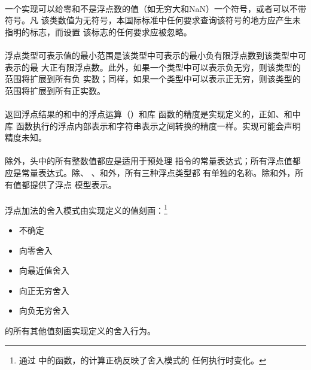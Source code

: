 \paragraph{}
一个实现可以给零和不是浮点数的值（如无穷大和NaN）一个符号，或者可以不带符号。凡
该类数值为无符号，本国际标准中任何要求查询该符号的地方应产生未指明的标志，而设置
该标志的任何要求应被忽略。

\paragraph{}
浮点类型可表示值的最小范围是该类型中可表示的最小负有限浮点数到该类型中可表示的最
大正有限浮点数。此外，如果一个类型中可以表示负无穷，则该类型的范围将扩展到所有负
实数；同样，如果一个类型中可以表示正无穷，则该类型的范围将扩展到所有正实数。

\paragraph{}
返回浮点结果的和中的浮点运算（）和库
函数的精度是实现定义的，正如、和中库
函数执行的浮点内部表示和字符串表示之间转换的精度一样。实现可能会声明精度未知。

\paragraph{}
除外，头中的所有整数值都应是适用于预处理
指令的常量表达式；所有浮点值都应是常量表达式。除、
、和外，所有三种浮点类型都
有单独的名称。除和外，所有值都提供了浮点
模型表示。

\paragraph{}
浮点加法的舍入模式由实现定义的值刻画：\footnote{通过
中的函数，的计算正确反映了舍入模式的
任何执行时变化。}
\begin{itemize}
  \item[]{  \qquad 不确定}
  \item[]{ \qquad 向零舍入}
  \item[]{ \qquad 向最近值舍入}
  \item[]{ \qquad 向正无穷舍入}
  \item[]{ \qquad 向负无穷舍入}
\end{itemize}
的所有其他值刻画实现定义的舍入行为。

